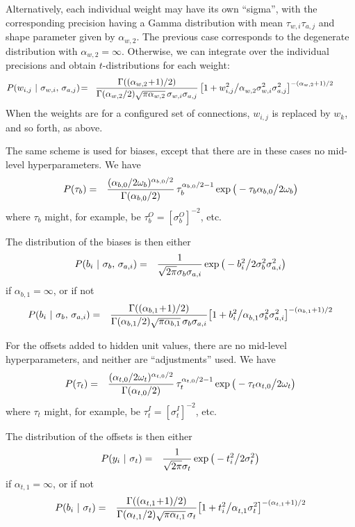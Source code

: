\documentclass{report}[11pt]
\def\beq{\begin{eqnarray}}
\def\eeq{\end{eqnarray}}
\def\eep{\end{eqnarray}}
\begin{document}
Alternatively, each individual weight may have its own ``sigma'', with
the corresponding precision having a Gamma distribution with mean
$\tau_{w,i}\tau_{a,j}$ and shape parameter given by $\alpha_{w,2}$.  The
previous case corresponds to the degenerate distribution with
$\alpha_{w,2} = \infty$.  Otherwise, we can integrate over the individual
precisions and obtain $t$-distributions for each weight:\beq
  P(w_{i,j}\ |\ \sigma_{w,i},\,\sigma_{a,j}) & \!=\! &
    {\Gamma((\alpha_{w,2}\!+\!1)/2) \over 
     \Gamma(\alpha_{w,2}/2) \sqrt{\pi\alpha_{w,2}}\, \sigma_{w,i}\sigma_{a,j}}\,
     \big[ 1 + w_{i,j}^2 \big/ \alpha_{w,2}^{\ }\sigma_{w,i}^2\sigma_{a,j}^2 
     \big]^{ -(\alpha_{w,2}+1)/2}\ \ \ \ \ \ \
\label{priorwt}\eeq
When the weights are for a configured set of connections, $w_{i,j}$ is
replaced by $w_k$, and so forth, as above.

The same scheme is used for biases, except that there are in
these cases no mid-level hyperparameters.  We have \beq
  P(\tau_b)
   & = & {(\alpha_{b,0}/2\omega_b)^{\alpha_{b,0}/2} 
          \over \Gamma(\alpha_{b,0}/2)}\,
         \tau_b^{\alpha_{b,0}/2-1}
         \exp \big(-\tau_b \alpha_{b,0} \big/ 2 \omega_b \big) 
\eeq%
where $\tau_b$ might, for example, be $\tau^{O}_b = [\sigma^{O}_b]^{-2}$, etc.

The distribution of the biases is then either\beq
  P(b_i\ |\ \sigma_b,\,\sigma_{a,i}) & = &
    {1 \over \sqrt{2\pi} \sigma_b\sigma_{a,i}} 
    \exp \big( - b_i^2 \big/ 2\sigma_b^2\sigma_{a,i}^2 \big)
\label{priorbg}\eeq%
if $\alpha_{b,1}=\infty$, or if not\beq
  P(b_i\ |\ \sigma_b,\,\sigma_{a,i}) & = &
    {\Gamma((\alpha_{b,1}\!+\!1)/2) \over 
     \Gamma(\alpha_{b,1}/2) \sqrt{\pi\alpha_{b,1}}\, \sigma_b \sigma_{a,i}}
     \big[ 1 + b_i^2 \big/ \alpha_{b,1}^{\ }\sigma_b^2\sigma_{a,i}^2 
     \big]^{-(\alpha_{b,1}+1)/2}
\label{priorbt}\eep

For the offsets added to hidden unit values, there are no mid-level 
hyperparameters, and neither are ``adjustments'' used.  We 
have\vspace{-10pt}\beq
  P(\tau_t)
   & = & {(\alpha_{t,0}/2\omega_t)^{\alpha_{t,0}/2} 
          \over \Gamma(\alpha_{t,0}/2)}\,
         \tau_t^{\alpha_{t,0}/2-1}
         \exp \big(-\tau_t \alpha_{t,0} \big/ 2 \omega_t \big) 
\eeq%
where $\tau_t$ might, for example, be $\tau^{I}_t = [\sigma^{I}_t]^{-2}$, etc.

The distribution of the offsets is then either\beq
  P(y_i\ |\ \sigma_t) & = &
    {1 \over \sqrt{2\pi} \sigma_t} 
    \exp \big( - t_i^2 \big/ 2\sigma_t^2 \big)
\label{priortg}\eeq%
if $\alpha_{t,1}=\infty$, or if not\beq
  P(b_i\ |\ \sigma_t) & = &
    {\Gamma((\alpha_{t,1}\!+\!1)/2) \over 
     \Gamma(\alpha_{t,1}/2) \sqrt{\pi\alpha_{t,1}}\, \sigma_t}
    \big[ 1 + t_i^2 \big/ \alpha_{t,1}^{\ }\sigma_t^2\big]^{-(\alpha_{t,1}+1)/2}
\label{priortt}\eep
\end{document}
